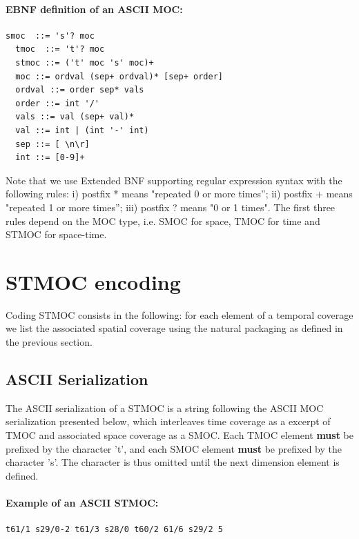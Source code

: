 \documentclass[11pt,a4paper]{ivoa}
\begin{document}
\paragraph{EBNF definition of an ASCII MOC:}
\begin{lstlisting}[]
  smoc  ::= 's'? moc
  tmoc  ::= 't'? moc
  stmoc ::= ('t' moc 's' moc)+
  moc ::= ordval (sep+ ordval)* [sep+ order]
  ordval ::= order sep* vals
  order ::= int '/'
  vals ::= val (sep+ val)*
  val ::= int | (int '-' int)
  sep ::= [ \n\r]
  int ::= [0-9]+
\end{lstlisting}
Note that we use Extended BNF supporting regular expression
syntax with the following rules: i) postfix * means "repeated
0 or more times”; ii) postfix + means "repeated 1 or more
times”; iii) postfix ? means "0 or 1 times". The first three
rules depend on the MOC type, i.e. SMOC for space, TMOC for
time and STMOC for space-time. 

\section{STMOC encoding}
\label{sec:stmoc}
Coding STMOC consists in the following: for each element of a
temporal coverage we list the associated spatial coverage using the
natural packaging as defined in the previous section. 

\subsection{ASCII Serialization}
The ASCII serialization of a STMOC is a string following the ASCII MOC
serialization presented below, which interleaves time coverage as a
excerpt of TMOC and associated space coverage as a SMOC. Each TMOC
element {\bf must} be prefixed by the character 't', and each SMOC
element {\bf must} be prefixed by the character 's'.
The character is thus omitted until the next dimension element is
defined.

\paragraph{Example of an ASCII STMOC:}
\begin{lstlisting}[]
  t61/1 s29/0-2 t61/3 s28/0 t60/2 61/6 s29/2 5
\end{lstlisting}
\end{document}
